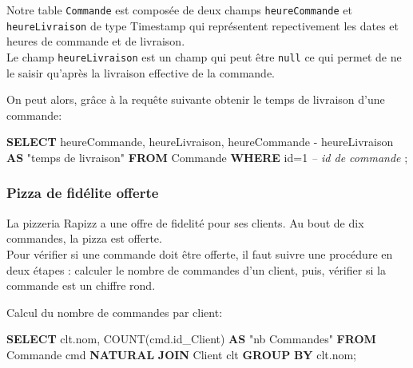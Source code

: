 \documentclass[]{article}
\newenvironment{Shaded}{}{}
\newcommand{\KeywordTok}[1]{\textcolor[rgb]{0.00,0.44,0.13}{\textbf{#1}}}
\newcommand{\DecValTok}[1]{\textcolor[rgb]{0.25,0.63,0.44}{#1}}
\newcommand{\CommentTok}[1]{\textcolor[rgb]{0.38,0.63,0.69}{\textit{#1}}}
\newcommand{\OtherTok}[1]{\textcolor[rgb]{0.00,0.44,0.13}{#1}}
\newcommand{\FunctionTok}[1]{\textcolor[rgb]{0.02,0.16,0.49}{#1}}
\newcommand{\NormalTok}[1]{#1}
\begin{document}
Notre table \texttt{Commande} est composée de deux champs
\texttt{heureCommande} et \texttt{heureLivraison} de type Timestamp qui
représentent repectivement les dates et heures de commande et de
livraison.\\
Le champ \texttt{heureLivraison} est un champ qui peut être
\texttt{null} ce qui permet de ne le saisir qu'après la livraison
effective de la commande.

On peut alors, grâce à la requête suivante obtenir le temps de livraison
d'une commande:

\begin{Shaded}
    \begin{Highlighting}[]
        \KeywordTok{SELECT}
        \NormalTok{    heureCommande,}
        \NormalTok{    heureLivraison,}
        \NormalTok{    heureCommande - heureLivraison }\KeywordTok{AS} \OtherTok{"temps de livraison"}
        \KeywordTok{FROM}\NormalTok{ Commande}
        \KeywordTok{WHERE}\NormalTok{ id=}\DecValTok{1} \CommentTok{-- id de commande}
        \NormalTok{;}
    \end{Highlighting}
\end{Shaded}

\newpage

\subsubsection{Pizza de fidélite
    offerte}\label{pizza-de-fiduxe9lite-offerte}

La pizzeria Rapizz a une offre de fidelité pour ses clients. Au bout de
dix commandes, la pizza est offerte.\\
Pour vérifier si une commande doit être offerte, il faut suivre une
procédure en deux étapes : calculer le nombre de commandes d'un client,
puis, vérifier si la commande est un chiffre rond.

Calcul du nombre de commandes par client:

\begin{Shaded}
    \begin{Highlighting}[]
        \KeywordTok{SELECT}
        \NormalTok{    clt.nom,}
        \FunctionTok{COUNT}\NormalTok{(cmd.id_Client) }\KeywordTok{AS} \OtherTok{"nb Commandes"}
        \KeywordTok{FROM}\NormalTok{ Commande cmd}
        \KeywordTok{NATURAL} \KeywordTok{JOIN}\NormalTok{ Client clt}
        \KeywordTok{GROUP} \KeywordTok{BY}\NormalTok{ clt.nom;}
    \end{Highlighting}
\end{Shaded}
\end{document}
